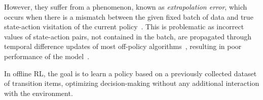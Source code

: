However, they suffer from a phenomenon, known as \textit{extrapolation error}, which occurs when there is a mismatch between the given fixed batch of data and true state-action visitation of the current policy~\citep{fujimoto2019off}. This is problematic as incorrect values of state-action pairs, not contained in the batch, are propagated through temporal difference updates of most off-policy algorithms~\citep{sutton1988learning}, resulting in poor performance of the model~\citep{thrun1993issues}. 

In offline RL, the goal is to learn a policy based on a previously collected dataset of transition items, optimizing decision-making without any additional interaction with the environment.